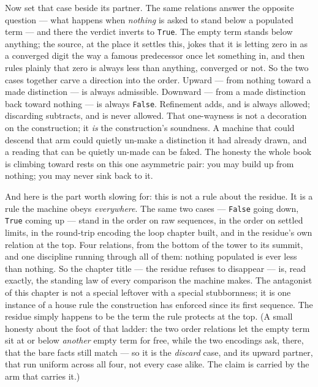 Now set that case beside its partner. The same relations answer the opposite question --- what happens when
\emph{nothing} is asked to stand below a populated term --- and there the verdict inverts to \verb|True|. The empty
term stands below anything; the source, at the place it settles this, jokes that it is letting zero in as a converged
digit the way a famous predecessor once let something in, and then rules plainly that zero is always less than
anything, converged or not. So the two cases together carve a direction into the order. Upward --- from nothing toward
a made distinction --- is always admissible. Downward --- from a made distinction back toward nothing --- is always
\verb|False|. Refinement adds, and is always allowed; discarding subtracts, and is never allowed. That one-wayness is
not a decoration on the construction; it \emph{is} the construction's soundness. A machine that could descend that arm
could quietly un-make a distinction it had already drawn, and a reading that can be quietly un-made can be faked. The
honesty the whole book is climbing toward rests on this one asymmetric pair: you may build up from nothing; you may
never sink back to it.

And here is the part worth slowing for: this is not a rule about the residue. It is a rule the machine obeys
\emph{everywhere}. The same two cases --- \verb|False| going down, \verb|True| coming up --- stand in the order on raw
sequences, in the order on settled limits, in the round-trip encoding the loop chapter built, and in the residue's own
relation at the top. Four relations, from the bottom of the tower to its summit, and one discipline running through
all of them: nothing populated is ever less than nothing. So the chapter title --- the residue refuses to disappear
--- is, read exactly, the standing law of every comparison the machine makes. The antagonist of this chapter is not a
special leftover with a special stubbornness; it is one instance of a house rule the construction has enforced since
its first sequence. The residue simply happens to be the term the rule protects at the top. (A small honesty about the
foot of that ladder: the two order relations let the empty term sit at or below \emph{another} empty term for free,
while the two encodings ask, there, that the bare facts still match --- so it is the \emph{discard} case, and its
upward partner, that run uniform across all four, not every case alike. The claim is carried by the arm that carries
it.)

